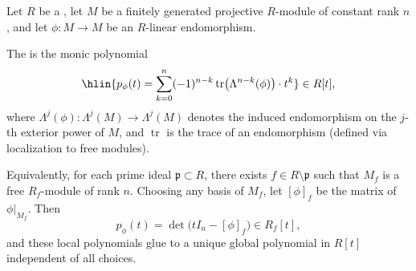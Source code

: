 \begin{definition} \label{definition:characteristic_polynomial_of_an_endomorphism_of_a_finitely_generated_projective_module_over_a_commutative_ring}
Let $R$ be a , let $M$ be a finitely generated projective $R$-module of constant rank $n$, and let $\phi : M \to M$ be an $R$-linear endomorphism.

The  is the monic polynomial
$$\hlin{p_\phi(t) = \sum_{k=0}^n (-1)^{n-k} \operatorname{tr}\!\big(\Lambda^{n-k}(\phi)\big) \cdot t^k} \in R[t],$$
where $\Lambda^j(\phi) : \Lambda^j(M) \to \Lambda^j(M)$ denotes the induced endomorphism on the $j$-th exterior power of $M$, and $\operatorname{tr}$ is the trace of an endomorphism (defined via localization to free modules).

Equivalently, for each prime ideal $\mathfrak{p} \subset R$, there exists $f \in R \setminus \mathfrak{p}$ such that $M_f$ is a free $R_f$-module of rank $n$. Choosing any basis of $M_f$, let $[\phi]_f$ be the matrix of $\phi|_{M_f}$. Then
$$p_\phi(t) = \det\big(tI_n - [\phi]_f\big) \in R_f[t],$$
and these local polynomials glue to a unique global polynomial in $R[t]$ independent of all choices.
\end{definition}